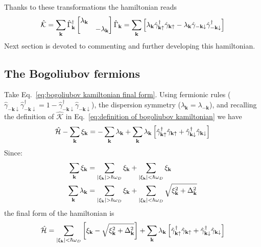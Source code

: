 Thanks to these transformations the hamiltonian reads
\begin{equation}\label{eq:bogoliubov kamiltonian final form}
	\hat{\mathcal{K}} = \sum_\mathbf{k} \hat{\Gamma}_\mathbf{k}^\dagger \begin{bmatrix}
		\lambda_\mathbf{k} & \\
		& -\lambda_\mathbf{k}
	\end{bmatrix} \hat{\Gamma}_\mathbf{k} =
	\sum_\mathbf{k} \left[{\lambda_\mathbf{k} \hat{\gamma}_{\mathbf{k}\uparrow}^\dagger \hat{\gamma}_{\mathbf{k}\uparrow} - \lambda_\mathbf{k} \hat{\gamma}_{-\mathbf{k}\downarrow}\hat{\gamma}_{-\mathbf{k}\downarrow}^\dagger}\right]
\end{equation}
Next section is devoted to commenting and further developing this hamiltonian.

\subsection{The Bogoliubov fermions}

Take Eq.~\eqref{eq:bogoliubov kamiltonian final form}. Using fermionic rules ($\hat{\gamma}_{-\mathbf{k}\downarrow}\hat{\gamma}_{-\mathbf{k}\downarrow}^\dagger = 1 - \hat{\gamma}_{-\mathbf{k}\downarrow}^\dagger\hat{\gamma}_{-\mathbf{k}\downarrow}$), the dispersion symmetry ($\lambda_\mathbf{k} = \lambda_{-\mathbf{k}}$), and recalling the definition of $\hat{\mathcal{K}}$ in Eq.~\eqref{eq:definition of bogoliubov kamiltonian} we have
\[
	\hat{\mathcal{H}} - \sum_\mathbf{k} \xi_\mathbf{k}  = -\sum_\mathbf{k} \lambda_\mathbf{k} + \sum_\mathbf{k} \lambda_\mathbf{k} \left[{ \hat{\gamma}_{\mathbf{k}\uparrow}^\dagger \hat{\gamma}_{\mathbf{k}\uparrow} + \hat{\gamma}_{\mathbf{k}\downarrow}^\dagger\hat{\gamma}_{\mathbf{k}\downarrow}}\right]
\]
Since:
\[
\begin{aligned}
	\sum_\mathbf{k} \xi_\mathbf{k} &= \sum_{\abs{\xi_\mathbf{k}}>\hbar\omega_D} \xi_\mathbf{k} + \sum_{\abs{\xi_\mathbf{k}}<\hbar\omega_D} \xi_\mathbf{k} \\
	\sum_\mathbf{k} \lambda_\mathbf{k} &= \sum_{\abs{\xi_\mathbf{k}}>\hbar\omega_D} \xi_\mathbf{k} + \sum_{\abs{\xi_\mathbf{k}}<\hbar\omega_D} \sqrt{\xi_\mathbf{k}^2 + \Delta_\mathbf{k}^2}
\end{aligned}
\]
the final form of the hamiltonian is
\[
	\hat{\mathcal{H}} = \sum_{\abs{\xi_\mathbf{k}}<\hbar\omega_D} \left[{\xi_\mathbf{k} - \sqrt{\xi_\mathbf{k}^2 + \Delta_\mathbf{k}^2}}\right] + \sum_\mathbf{k} \lambda_\mathbf{k} \left[{ \hat{\gamma}_{\mathbf{k}\uparrow}^\dagger \hat{\gamma}_{\mathbf{k}\uparrow} + \hat{\gamma}_{\mathbf{k}\downarrow}^\dagger\hat{\gamma}_{\mathbf{k}\downarrow}}\right]
\]

